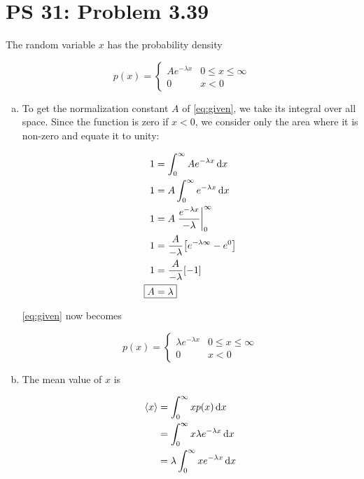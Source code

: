 \documentclass[12pt,a4paper,twocolumn]{article}
\begin{document}
\setcounter{page}{1}

\section*{PS 31: Problem 3.39}
\bigskip

The random variable $x$ has the probability density

\begin{equation}\label{eq:given}
	p(x) =
	\begin{cases}
		Ae^{-\lambda x} & 0 \leq x \leq \infty \\
		0 & x < 0
	\end{cases}
\end{equation}


\begin{enumerate}[(a)]

\item To get the normalization constant $A$ of \eqref{eq:given}, we take its integral over all space. Since the function is zero if $x < 0$, we consider only the area where it is non-zero and equate it to unity:

\begin{align}
	1 &= \int_0^\infty Ae^{-\lambda x} \dd{x} \\
	1 &= A\int_0^\infty e^{-\lambda x}\dd{x} \nonumber \\
	1 &= A\eval{\frac{e^{-\lambda x}}{-\lambda}}_0^\infty \nonumber \\
	1 &= \frac{A}{-\lambda}\qty[e^{-\lambda\infty} - e^0] \nonumber \\
	1 &= \frac{A}{-\lambda}\qty[-1] \nonumber \\
	\Aboxed{
		A &= \lambda
	} \label{eq:answer-a}
\end{align}

\eqref{eq:given} now becomes

\begin{equation}\label{eq:given-normed}
	p(x) =
	\begin{cases}
		\lambda e^{-\lambda x} & 0 \leq x \leq \infty \\
		0 & x < 0
	\end{cases}
\end{equation}

\item The mean value of $x$ is

\begin{align}
	\ev{x} &= \int_0^\infty x p(x) \dd{x} \\
	&= \int_0^\infty x\lambda e^{-\lambda x} \dd{x} \nonumber \\
	&= \lambda \int_0^\infty xe^{-\lambda x} \dd{x}
\end{align}


\end{enumerate}
\end{document}
